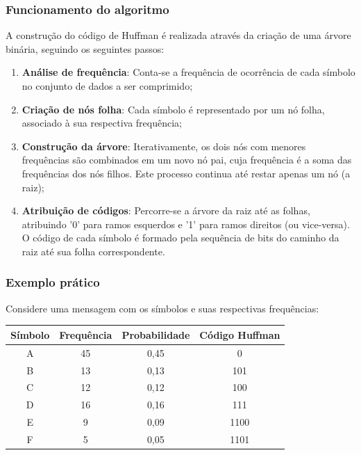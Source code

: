 \subsubsection{Funcionamento do algoritmo}

A construção do código de Huffman é realizada através da criação de uma árvore binária, seguindo os seguintes passos:

\begin{enumerate}
    \item \textbf{Análise de frequência}: Conta-se a frequência de ocorrência de cada símbolo no conjunto de dados a ser comprimido;
    
    \item \textbf{Criação de nós folha}: Cada símbolo é representado por um nó folha, associado à sua respectiva frequência;
    
    \item \textbf{Construção da árvore}: Iterativamente, os dois nós com menores frequências são combinados em um novo nó pai, cuja frequência é a soma das frequências dos nós filhos. Este processo continua até restar apenas um nó (a raiz);
    
    \item \textbf{Atribuição de códigos}: Percorre-se a árvore da raiz até as folhas, atribuindo '0' para ramos esquerdos e '1' para ramos direitos (ou vice-versa). O código de cada símbolo é formado pela sequência de bits do caminho da raiz até sua folha correspondente.
\end{enumerate}

\subsubsection{Exemplo prático}

Considere uma mensagem com os símbolos e suas respectivas frequências:

\begin{center}
\begin{tabular}{cccc}
\toprule
Símbolo & Frequência & Probabilidade & Código Huffman \\
\midrule
A & 45 & 0,45 & 0 \\
B & 13 & 0,13 & 101 \\
C & 12 & 0,12 & 100 \\
D & 16 & 0,16 & 111 \\
E & 9 & 0,09 & 1100 \\
F & 5 & 0,05 & 1101 \\
\bottomrule
\end{tabular}
\end{center}

